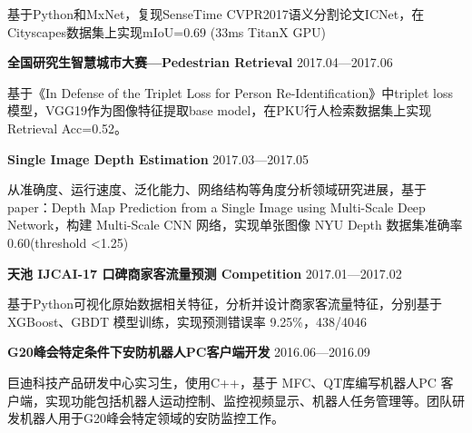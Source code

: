 \documentclass{article}
\begin{document}
\linespread{1.2}\selectfont %
\par 基于Python和MxNet，复现SenseTime CVPR2017语义分割论文ICNet，在Cityscapes数据集上实现mIoU=0.69 (33ms TitanX GPU)

\par \large \textbf{全国研究生智慧城市大赛—Pedestrian Retrieval}  \hfill 2017.04—2017.06
\linespread{1.6}\selectfont %

\linespread{1.2}\selectfont %
\par 基于《In Defense of the Triplet Loss for Person Re-Identification》中triplet loss模型，VGG19作为图像特征提取base model，在PKU行人检索数据集上实现Retrieval Acc=0.52。

\par \large \textbf{Single Image Depth Estimation}  \hfill 2017.03—2017.05
\linespread{1.6}\selectfont %

\linespread{1.2}\selectfont %
\par 从准确度、运行速度、泛化能力、网络结构等角度分析领域研究进展，基于paper：Depth Map Prediction from a Single Image using Multi-Scale Deep Network，构建 Multi-Scale CNN 网络，实现单张图像 NYU Depth 数据集准确率 0.60(threshold <1.25)

\par \large \textbf{天池 IJCAI-17 口碑商家客流量预测 Competition}  \hfill 2017.01—2017.02
\linespread{1.6}\selectfont %

\linespread{1.2}\selectfont %
\par 基于Python可视化原始数据相关特征，分析并设计商家客流量特征，分别基于 XGBoost、GBDT 模型训练，实现预测错误率 9.25\%，438/4046


\par \large \textbf{G20峰会特定条件下安防机器人PC客户端开发}  \hfill 2016.06—2016.09
\linespread{1.6}\selectfont %

\linespread{1.2}\selectfont %
\par 巨迪科技产品研发中心实习生，使用C++，基于 MFC、QT库编写机器人PC 客户端，实现功能包括机器人运动控制、监控视频显示、机器人任务管理等。团队研发机器人用于G20峰会特定领域的安防监控工作。
\end{document}
